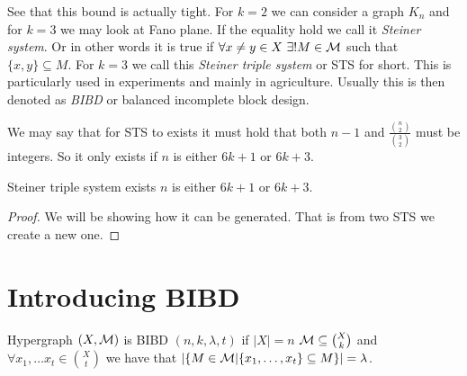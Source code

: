 \noindent See that this bound is actually tight. For $k=2$ we can consider a graph $K_n$ and for $k=3$ we may look at Fano plane. If the equality hold we call it \textit{Steiner system}. Or in other words it is true if $\forall x \neq y \in X \ \exists! M \in \mathcal{M}$ such that $\{x,y\} \subseteq M$. For $k = 3$ we call this \textit{Steiner triple system} or STS for short. This is particularly used in experiments and mainly in agriculture. Usually this is then denoted as \textit{BIBD} or balanced incomplete block design.

We may say that for STS to exists it must hold that both $n-1$ and $\frac{\binom{n}{2}}{\binom{3}{2}}$ must be integers. So it only exists if $n$ is either $6k+1$ or $6k+3$.

\begin{thm}
	Steiner triple system exists \ifft $n$ is either $6k+1$ or $6k+3$.
\end{thm}

\begin{proof}
	We will be showing how it can be generated. That is from two STS we create a new one.
\end{proof}

\section{Introducing BIBD}

\begin{defn}[BIBD]
	Hypergraph $(X, \mathcal{M})$ is BIBD $(n,k,\lambda,t)$ if $|X| = n$ $\mathcal{M} \subseteq \binom{X}{k}$ and $\forall x_1, \dots x_t \in \binom{X}{t}$ we have that $|\{M \in \mathcal{M} | \{x_1, \dots, x_t\} \subseteq M\}| = \lambda$. 
\end{defn}